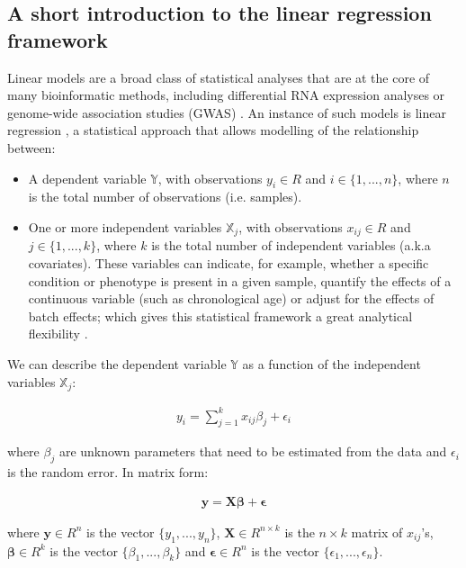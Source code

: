 \subsection*{A short introduction to the linear regression framework}

Linear models are a broad class of statistical analyses that are at the core of many bioinformatic methods, including differential RNA expression analyses \citep{Ritchie2015} or genome-wide association studies (GWAS) \citep{Visscher2017}. An instance of such models is linear regression \citep{Eaton2007}, a statistical approach that allows modelling of the relationship between:

\begin{itemize}
	
	\item A dependent variable $\mathbb Y$, with observations $y_i \in R$ and $i \in \{1, ..., n\}$, where $n$ is the total number of observations (i.e. samples). 
	
	\item One or more independent variables $\mathbb X_j$, with observations $x_{ij} \in R$ and $j \in \{1, ..., k\}$, where $k$ is the total number of independent variables (a.k.a covariates). These variables can indicate, for example, whether a specific condition or phenotype is present in a given sample, quantify the effects of a continuous variable (such as chronological age) or adjust for the effects of batch effects; which gives this statistical framework a great analytical flexibility \citep{Ritchie2015}.
	
\end{itemize}

We can describe the dependent variable $\mathbb Y$ as a function of the independent variables $\mathbb X_j$:

\begin{align}
y_i = \sum_{j=1}^{k} x_{ij}\beta_j + \epsilon_i
\end{align} 

where $\beta_j$ are unknown parameters that need to be estimated from the data and $\epsilon_i$ is the random error. In matrix form:

\begin{align}
\mathbf{y} = \mathbf{X}\mathbf{\beta} + \mathbf{\epsilon}
\end{align}

where  $\mathbf{y} \in R^n$ is the vector $\{y_1, ..., y_n\}$, $\mathbf{X} \in R^{n \times k}$ is the $n \times k$ matrix of $x_{ij}$'s, $\mathbf{\beta} \in R^k$ is the vector $\{\beta_1, ..., \beta_k\}$ and $\mathbf{\epsilon} \in R^n$ is the vector $\{\epsilon_1, ..., \epsilon_n\}$.

